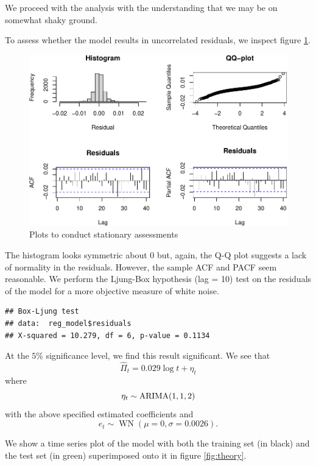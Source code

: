 \documentclass[final,
  11pt,
]{article}
\begin{document}
We proceed with the analysis with the understanding that we may be
on somewhat shaky ground.

To assess whether the model results in uncorrelated residuals, we
inspect figure \ref{fig:res}.

\begin{figure}
\includegraphics{paper_files/figure-latex/unnamed-chunk-18-1.pdf}
\caption{Plots to conduct stationary assessments}
\label{fig:res}
\end{figure}

The histogram looks symmetric about \(0\) but, again, the Q-Q plot suggests a
lack of normality in the residuals. However, the sample ACF and PACF
seem reasonable. We perform the Ljung-Box hypothesis (lag = 10) test on
the residuals of the model for a more objective measure of white noise.

\begin{verbatim}
## Box-Ljung test
## data:  reg_model$residuals
## X-squared = 10.279, df = 6, p-value = 0.1134
\end{verbatim}

At the \(5\%\) significance level, we find this result significant. We see that
\[
  \hat{\Pi}_t = 0.029 \log t + \eta_t
\] where \[
  \eta_t \sim \operatorname{ARIMA}(1,1,2)
\] with the above specified estimated coefficients and \[
  e_t \sim \operatorname{WN}(\mu=0,\sigma=0.0026).
\]

We show a time series plot of the model with both the training set (in
black) and the test set (in green) superimposed onto it in figure \ref{fig:theory}.
\end{document}
